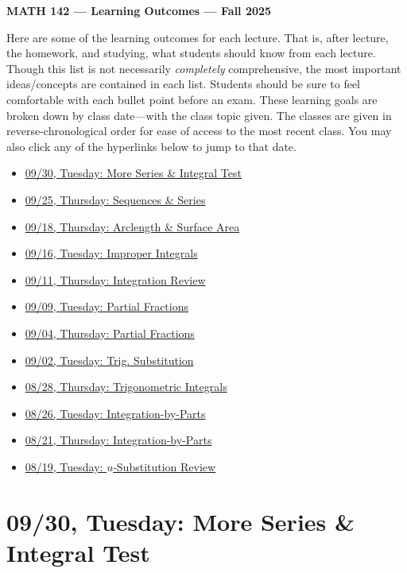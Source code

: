 \documentclass[11pt,letterpaper]{article}
\begin{document}
\begin{center} {\bfseries \LARGE MATH 142 --- Learning Outcomes --- Fall 2025} \end{center}

Here are some of the learning outcomes for each lecture. That is, after lecture, the homework, and studying, what students should know from each lecture. Though this list is not necessarily \textit{completely} comprehensive, the most important ideas/concepts are contained in each list. Students should be sure to feel comfortable with each bullet point before an exam. These learning goals are broken down by class date---with the class topic given. The classes are given in reverse-chronological order for ease of access to the most recent class. You may also click any of the hyperlinks below to jump to that date. 

\begin{itemize}
\item \hyperref[09-30]{09/30, Tuesday: More Series \& Integral Test}
\item \hyperref[09-25]{09/25, Thursday: Sequences \& Series}
\item \hyperref[09-18]{09/18, Thursday: Arclength \& Surface Area}
\item \hyperref[09-16]{09/16, Tuesday: Improper Integrals}
\item \hyperref[09-11]{09/11, Thursday: Integration Review}
\item \hyperref[09-09]{09/09, Tuesday: Partial Fractions}
\item \hyperref[09-04]{09/04, Thursday: Partial Fractions}
\item \hyperref[09-02]{09/02, Tuesday: Trig. Substitution}
\item \hyperref[08-28]{08/28, Thursday: Trigonometric Integrals}
\item \hyperref[08-26]{08/26, Tuesday: Integration-by-Parts}
\item \hyperref[08-21]{08/21, Thursday: Integration-by-Parts}
\item \hyperref[08-19]{08/19, Tuesday: $u$-Substitution Review}
\end{itemize}

\newpage
\section*{09/30, Tuesday: More Series \& Integral Test\label{09-30}}
\end{document}
